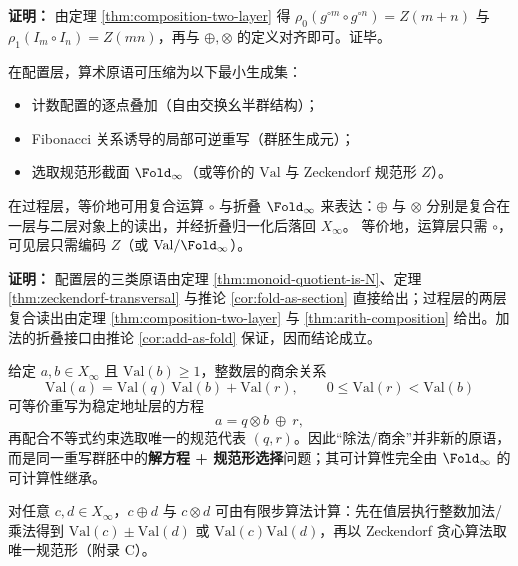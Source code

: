 \textbf{证明：}
由定理 \ref{thm:composition-two-layer} 得 $\rho_0(g^{\circ m}\circ g^{\circ n})=Z(m+n)$ 与 $\rho_1(I_m\circ I_n)=Z(mn)$，再与 $\oplus,\otimes$ 的定义对齐即可。证毕。

\begin{corollary}\label{cor:primitive-free-arith}
在配置层，算术原语可压缩为以下最小生成集：
\begin{itemize}
  \item 计数配置的逐点叠加（自由交换幺半群结构）；
  \item Fibonacci 关系诱导的局部可逆重写（群胚生成元）；
  \item 选取规范形截面 $\Fold_\infty$（或等价的 $\mathrm{Val}$ 与 Zeckendorf 规范形 $Z$）。
\end{itemize}
在过程层，等价地可用复合运算 $\circ$ 与折叠 $\Fold_\infty$ 来表达：$\oplus$ 与 $\otimes$ 分别是复合在一层与二层对象上的读出，并经折叠归一化后落回 $X_\infty$。
等价地，运算层只需 $\circ$，可见层只需编码 $Z$（或 $\mathrm{Val}/\Fold_\infty$）。
\end{corollary}

\textbf{证明：}
配置层的三类原语由定理 \ref{thm:monoid-quotient-is-N}、定理 \ref{thm:zeckendorf-transversal} 与推论 \ref{cor:fold-as-section} 直接给出；过程层的两层复合读出由定理 \ref{thm:composition-two-layer} 与 \ref{thm:arith-composition} 给出。加法的折叠接口由推论 \ref{cor:add-as-fold} 保证，因而结论成立。

\begin{remark}[商余作为规范形选择]\label{rem:division-as-selection}
给定 $a,b\in X_\infty$ 且 $\mathrm{Val}(b)\ge 1$，整数层的商余关系
\[
\mathrm{Val}(a)=\mathrm{Val}(q)\,\mathrm{Val}(b)+\mathrm{Val}(r),\qquad 0\le \mathrm{Val}(r)<\mathrm{Val}(b)
\]
可等价重写为稳定地址层的方程
\[
a=q\otimes b\ \oplus\ r,
\]
再配合不等式约束选取唯一的规范代表 $(q,r)$。因此“除法/商余”并非新的原语，而是同一重写群胚中的\textbf{解方程 + 规范形选择}问题；其可计算性完全由 $\Fold_\infty$ 的可计算性继承。
\end{remark}

\begin{proposition}[可计算实现]\label{prop:zeckendorf-arith-computable}
对任意 $c,d\in X_\infty$，$c\oplus d$ 与 $c\otimes d$ 可由有限步算法计算：先在值层执行整数加法/乘法得到 $\mathrm{Val}(c)\pm\mathrm{Val}(d)$ 或 $\mathrm{Val}(c)\mathrm{Val}(d)$，再以 Zeckendorf 贪心算法取唯一规范形（附录 C）。
\end{proposition}

